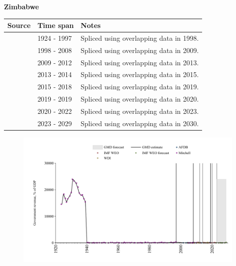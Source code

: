 \documentclass[12pt,a4paper,landscape]{article}
\begin{document}
\begin{adjustbox}{max totalsize={\paperwidth}{\paperheight},center}
\begin{minipage}[t][\textheight][t]{\textwidth}
\vspace*{0.5cm}
{}
\begin{center}
{\Large\bfseries Zimbabwe}
\end{center}
\vspace{0.5cm}
\begin{table}[H]
\centering
\small
\begin{tabular}{|l|l|l|}
\hline
\textbf{Source} & \textbf{Time span} & \textbf{Notes} \\
\hline
\rowcolor{white}\cite{Mitchell}& 1924 - 1997 &Spliced using overlapping data in 1998.\\
\rowcolor{lightgray}\cite{AFDB}& 1998 - 2008 &Spliced using overlapping data in 2009.\\
\rowcolor{white}\cite{WDI}& 2009 - 2012 &Spliced using overlapping data in 2013.\\
\rowcolor{lightgray}\cite{AFDB}& 2013 - 2014 &Spliced using overlapping data in 2015.\\
\rowcolor{white}\cite{WDI}& 2015 - 2018 &Spliced using overlapping data in 2019.\\
\rowcolor{lightgray}\cite{AFDB}& 2019 - 2019 &Spliced using overlapping data in 2020.\\
\rowcolor{white}\cite{IMF_WEO}& 2020 - 2022 &Spliced using overlapping data in 2023.\\
\rowcolor{lightgray}\cite{IMF_WEO_forecast}& 2023 - 2029 &Spliced using overlapping data in 2030.\\
\hline
\end{tabular}
\end{table}
\begin{figure}[H]
\centering
\includegraphics[width=\textwidth,height=0.6\textheight,keepaspectratio]{graphs/ZWE_govrev_GDP.pdf}
\end{figure}
\end{minipage}
\end{adjustbox}
\end{document}
